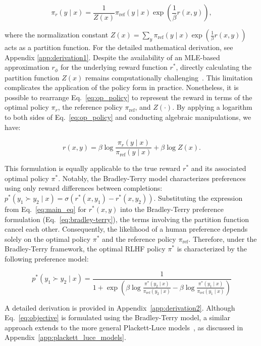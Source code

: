 \begin{equation}\label{eq:op_policy}
    \pi_r(y\mid x) = \frac{1}{Z(x)}\pi_\text{ref}(y\mid x)\exp\left(\frac{1}{\beta}r(x, y)\right),
\end{equation}

where the normalization constant $Z(x) = \sum_{y}\pi_\text{ref}(y\mid x)\exp\left(\frac{1}{\beta}r(x, y)\right)$ acts as a partition function. For the detailed mathematical derivation, see Appendix \ref{app:derivation1}. Despite the availability of an MLE-based approximation $r_{\phi}$ for the underlying reward function $r^*$, directly calculating the partition function $Z(x)$ remains computationally challenging~\citep{korbak2022reinforcement, go2023aligning}. This limitation complicates the application of the policy form in practice. Nonetheless, it is possible to rearrange Eq.~\ref{eq:op_policy} to represent the reward in terms of the optimal policy $\pi_r$, the reference policy $\pi_\text{ref}$, and $Z(\cdot)$. By applying a logarithm to both sides of Eq.~\ref{eq:op_policy} and conducting algebraic manipulations, we have:

\begin{equation}\label{eq:main_eq}
    r(x,y) =\beta \log \frac{\pi_r(y\mid x)}{\pi_\text{ref}(y\mid x)} + \beta \log Z(x).
\end{equation}

This formulation is equally applicable to the true reward $r^*$ and its associated optimal policy $\pi^*$. Notably, the Bradley-Terry model characterizes preferences using only reward differences between completions: ${p^*(y_1 \succ y_2 \mid x) = \sigma(r^*(x, y_1) - r^*(x, y_2))}$. Substituting the expression from Eq.~\ref{eq:main_eq} for $r^*(x,y)$ into the Bradley-Terry preference formulation (Eq.~\ref{eq:bradley-terry}), the terms involving the partition function cancel each other. Consequently, the likelihood of a human preference depends solely on the optimal policy $\pi^*$ and the reference policy $\pi_\text{ref}$. Therefore, under the Bradley-Terry framework, the optimal RLHF policy $\pi^*$ is characterized by the following preference model:

\begin{equation}\label{eq:objective}
    p^*(y_1\succ y_2 \mid x)=\frac{1}{1 + \exp\left(\beta \log \frac{\pi^*(y_2\mid x)}{\pi_\text{ref}(y_2\mid x)} - \beta \log \frac{\pi^*(y_1\mid x)}{\pi_\text{ref}(y_1\mid x)}\right)}
\end{equation}

A detailed derivation is provided in Appendix~\ref{app:derivation2}. Although Eq.~\ref{eq:objective} is formulated using the Bradley-Terry model, a similar approach extends to the more general Plackett-Luce models~\citep{plackett1975analysis, luce2012individual}, as discussed in Appendix~\ref{app:plackett_luce_models}.

